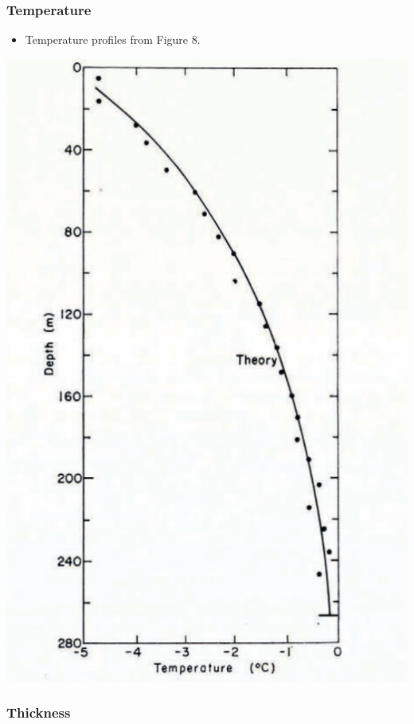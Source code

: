 \documentclass[article,a4paper,times,11pt,twoside]{article}
\begin{document}
\subsubsection{Temperature}
\label{sec:orgb69ae8e}

\begin{itemize}
\item Temperature profiles from \textcite{colbeck_1979} Figure 8.
\end{itemize}

\begin{center}
\includegraphics[width=.9\linewidth]{isua_13/isua_13.png}
\end{center}

\subsubsection{Thickness}
\label{sec:org97e0e5e}
\end{document}

